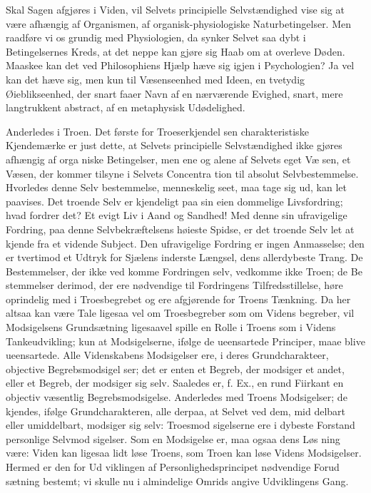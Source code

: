 \documentclass[12pt]{book}
\newcommand{\opage}[1]{\marginnote{\footnotesize\textit{[#1]}}}
\begin{document}
Skal Sagen afgjøres i Viden, vil Selvets principielle
Selvstændighed vise sig at være afhængig af Organismen,
af organisk-physiologiske Naturbetingelser. Men raadføre
vi os grundig med Physiologien, da synker Selvet saa
dybt i Betingelsernes Kreds, at det neppe kan gjøre sig
Haab om at overleve Døden. Maaskee kan det ved
Philosophiens Hjælp hæve sig igjen i Psychologien? Ja
vel kan det hæve sig, men kun til Væsenseenhed med Ideen,
en tvetydig Øieblikseenhed, der snart faaer Navn af en
nærværende Evighed, snart, mere langtrukkent abstract,
af en metaphysisk Udødelighed.

Anderledes i Troen. Det første for Troeserkjendel\-%
sen charakteristiske Kjendemærke er just dette, at Selvets
principielle Selvstændighed ikke gjøres afhængig af orga\-%
niske Betingelser, men ene og alene af Selvets eget Væ\-%
sen, et Væsen, der kommer tilsyne i Selvets Concentra\-%
tion til absolut Selvbestemmelse. Hvorledes denne Selv\-%
bestemmelse, menneskelig seet, maa tage sig ud, kan let
paavises. Det troende Selv er kjendeligt paa sin eien\-%
dommelige Livsfordring; hvad fordrer det? Et evigt
Liv i Aand og Sandhed! Med denne sin ufravigelige
Fordring, paa denne Selvbekræftelsens høieste Spidse,
er det troende Selv let at kjende fra et vidende Subject.
\opage{140}\setcounter{footnote}{0}%
Den ufravigelige Fordring er ingen Anmasselse; den er
tvertimod et Udtryk for Sjælens inderste Længsel, dens
allerdybeste Trang. De Bestemmelser, der ikke ved\-%
komme Fordringen selv, vedkomme ikke Troen; de Be\-%
stemmelser derimod, der ere nødvendige til Fordringens
Tilfredsstillelse, høre oprindelig med i Troesbegrebet og
ere afgjørende for Troens Tænkning. Da her altsaa kan
være Tale ligesaa vel om Troesbegreber som om Videns\-%
begreber, vil Modsigelsens Grundsætning ligesaavel
spille en Rolle i Troens som i Videns Tankeudvikling;
kun at Modsigelserne, ifølge de ueensartede Principer,
maae blive ueensartede. Alle Videnskabens Modsigelser
ere, i deres Grundcharakteer, objective Begrebsmodsigel\-%
ser; det er enten et Begreb, der modsiger et andet, eller
et Begreb, der modsiger sig selv. Saaledes er, f. Ex.,
en rund Fiirkant en objectiv væsentlig Begrebsmodsigelse.
Anderledes med Troens Modsigelser; de kjendes, ifølge
Grundcharakteren, alle derpaa, at Selvet ved dem, mid\-%
delbart eller umiddelbart, modsiger sig selv: Troesmod\-%
sigelserne ere i dybeste Forstand personlige Selvmod\-%
sigelser. Som en Modsigelse er, maa ogsaa dens Løs\-%
ning være: Viden kan ligesaa lidt løse Troens, som Troen
kan løse Videns Modsigelser. Hermed er den for Ud\-%
viklingen af Personlighedsprincipet nødvendige Forud\-%
sætning bestemt; vi skulle nu i almindelige Omrids angive
Udviklingens Gang.
\end{document}
